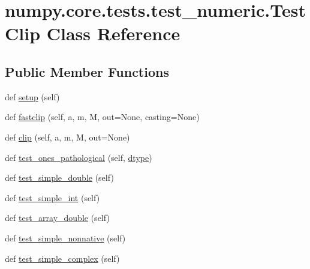 \hypertarget{classnumpy_1_1core_1_1tests_1_1test__numeric_1_1TestClip}{}\section{numpy.\+core.\+tests.\+test\+\_\+numeric.\+Test\+Clip Class Reference}
\label{classnumpy_1_1core_1_1tests_1_1test__numeric_1_1TestClip}
\subsection*{Public Member Functions}
\begin{DoxyCompactItemize}
\item 
def \hyperlink{classnumpy_1_1core_1_1tests_1_1test__numeric_1_1TestClip_a99975e9de39f18d8936d866f171ed3e6}{setup} (self)
\item 
def \hyperlink{classnumpy_1_1core_1_1tests_1_1test__numeric_1_1TestClip_a0562c3ab6e4be9fb211e72c64fb0f66a}{fastclip} (self, a, m, M, out=None, casting=None)
\item 
def \hyperlink{classnumpy_1_1core_1_1tests_1_1test__numeric_1_1TestClip_ad87915349f7a968fe652688c2b968428}{clip} (self, a, m, M, out=None)
\item 
def \hyperlink{classnumpy_1_1core_1_1tests_1_1test__numeric_1_1TestClip_a10488c5da0fd0797f836043008a3a2d6}{test\+\_\+ones\+\_\+pathological} (self, \hyperlink{classnumpy_1_1core_1_1tests_1_1test__numeric_1_1TestClip_ad8043e11a09cde6a4dc15e86d71bbc1c}{dtype})
\item 
def \hyperlink{classnumpy_1_1core_1_1tests_1_1test__numeric_1_1TestClip_a6501864a04721c1da1b6f9fb4eee9dd8}{test\+\_\+simple\+\_\+double} (self)
\item 
def \hyperlink{classnumpy_1_1core_1_1tests_1_1test__numeric_1_1TestClip_af3c8c6529616f8512780139afff44fff}{test\+\_\+simple\+\_\+int} (self)
\item 
def \hyperlink{classnumpy_1_1core_1_1tests_1_1test__numeric_1_1TestClip_adbb0aaf162a832b0dbebb662d748b4be}{test\+\_\+array\+\_\+double} (self)
\item 
def \hyperlink{classnumpy_1_1core_1_1tests_1_1test__numeric_1_1TestClip_aa9295cc7e4d97a189c64959f0037634e}{test\+\_\+simple\+\_\+nonnative} (self)
\item 
def \hyperlink{classnumpy_1_1core_1_1tests_1_1test__numeric_1_1TestClip_a675235bc70916f731e63d516ee005ca0}{test\+\_\+simple\+\_\+complex} (self)
\item 

\end{DoxyCompactItemize}

